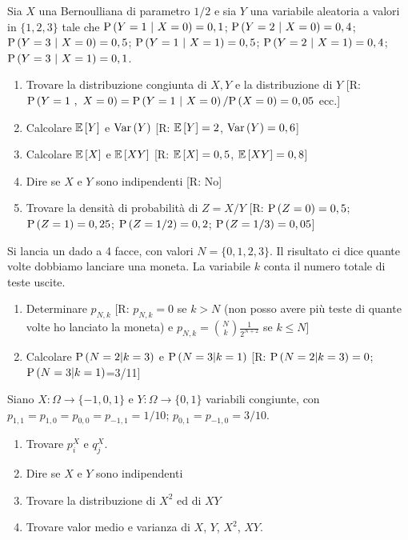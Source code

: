     \begin{exrc}
    Sia $X$ una Bernoulliana di parametro $1/2$ e sia $Y$ una variabile aleatoria a valori in $\{1,2,3\}$
    tale che  $\text{P}\left(Y=1\  |\ X=0\right)=0,1$; $\text{P}\left(Y=2\  |\ X=0\right)=0,4$; $\text{P}\left(Y=3\  |\ X=0\right)=0,5$; $\text{P}\left(Y=1\  |\ X=1\right)=0,5$; 
    $\text{P}\left(Y=2\  |\ X=1\right)=0,4$; $\text{P}\left(Y=3\  |\ X=1\right)=0,1$.
    \begin{enumerate}
    \item Trovare la distribuzione congiunta di $X,Y$ e la distribuzione di $Y$
    [R: $\p{Y=1\  ,\ X=0}=\p{Y=1\  |\ X=0}/\p{X=0}=0,05$ ecc.]
    \item Calcolare $\mathbb{E}\left[Y\right]$ e $\text{Var}\left(Y\right)$ [R: $\mathbb{E}\left[Y\right]=2$, $\text{Var}\left(Y\right)=0,6$]
    \item Calcolare $\mathbb{E}\left[X\right]$ e $\mathbb{E}\left[XY\right]$ [R: $\mathbb{E}\left[X\right]=0,5$, $\mathbb{E}\left[XY\right]=0,8$]
    \item Dire se $X$ e $Y$ sono indipendenti [R: No]
    \item Trovare la densit\`a di probabilit\`a di $Z=X/Y$ [R: $\text{P}\left(Z=0\right)=0,5$; 
    $\text{P}\left(Z=1\right)=0,25$; $\text{P}\left(Z=1/2\right)=0,2$; $\text{P}\left(Z=1/3\right)=0,05$]
    \end{enumerate}
    \end{exrc} \begin{exrc} Si lancia un dado a 4 facce, con valori $N=\{0,1,2,3\}$. Il risultato ci dice quante 
    volte dobbiamo lanciare una moneta. La variabile $k$ conta il numero totale di teste uscite.
    \begin{enumerate}
    \item Determinare $p_{N,k}$ [R: $p_{N,k}=0$ se $k>N$ (non posso avere pi\`u teste di quante 
    volte ho lanciato la moneta) e $p_{N,k}=\binom{N}{k} \frac{1}{2^{N+2}}$ se $k\le N$]
    \item Calcolare $\text{P}\left(N=2 | k=3\right)$ e $\text{P}\left(N=3 | k=1\right)$ [R: $\text{P}\left(N=2 | k=3\right)=0$;
    $\text{P}\left(N=3 | k=1\right)$=3/11]
    \end{enumerate}
    \end{exrc} 
    
    \begin{exrc} Siano $X:\Omega\rightarrow \{-1,0,1\}$ e $Y:\Omega\rightarrow \{0,1\}$
    variabili congiunte, con $p_{1,1}=p_{1,0}=p_{0,0}=p_{-1,1}=1/10$; $p_{0,1}=p_{-1,0}=3/10$.
    \begin{enumerate} 
    \item Trovare $p^X_i$ e $q^X_j$.
    \item Dire se $X$ e $Y$ sono indipendenti
    \item Trovare la distribuzione di $X^2$ ed di $XY$
    \item Trovare valor medio e varianza di $X$, $Y$, $X^2$, $XY$. 
    \end{enumerate}
\end{exrc}


